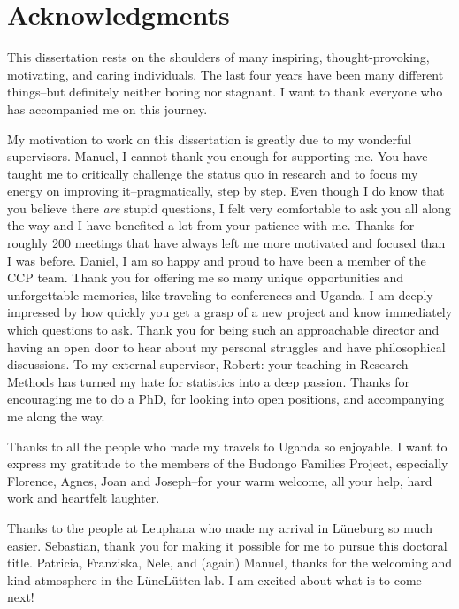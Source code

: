 \documentclass[
]{scrbook}
\begin{document}


\newpage

\chapter{Acknowledgments}\label{acknowledgments}

This dissertation rests on the shoulders of many inspiring, thought-provoking, motivating, and caring individuals. The last four years have been many different things\thinspace --\thinspace but definitely neither boring nor stagnant. I want to thank everyone who has accompanied me on this journey.

My motivation to work on this dissertation is greatly due to my wonderful supervisors. Manuel, I cannot thank you enough for supporting me. You have taught me to critically challenge the status quo in research and to focus my energy on improving it\thinspace --\thinspace pragmatically, step by step. Even though I do know that you believe there \emph{are} stupid questions, I felt very comfortable to ask you all along the way and I have benefited a lot from your patience with me. Thanks for roughly 200 meetings that have always left me more motivated and focused than I was before. Daniel, I am so happy and proud to have been a member of the CCP team. Thank you for offering me so many unique opportunities and unforgettable memories, like traveling to conferences and Uganda. I am deeply impressed by how quickly you get a grasp of a new project and know immediately which questions to ask. Thank you for being such an approachable director and having an open door to hear about my personal struggles and have philosophical discussions. To my external supervisor, Robert: your teaching in Research Methods has turned my hate for statistics into a deep passion. Thanks for encouraging me to do a PhD, for looking into open positions, and accompanying me along the way.

Thanks to all the people who made my travels to Uganda so enjoyable. I want to express my gratitude to the members of the Budongo Families Project, especially Florence, Agnes, Joan and Joseph\thinspace --\thinspace for your warm welcome, all your help, hard work and heartfelt laughter.

Thanks to the people at Leuphana who made my arrival in Lüneburg so much easier. Sebastian, thank you for making it possible for me to pursue this doctoral title. Patricia, Franziska, Nele, and (again) Manuel, thanks for the welcoming and kind atmosphere in the LüneLütten lab. I am excited about what is to come next!
\end{document}
